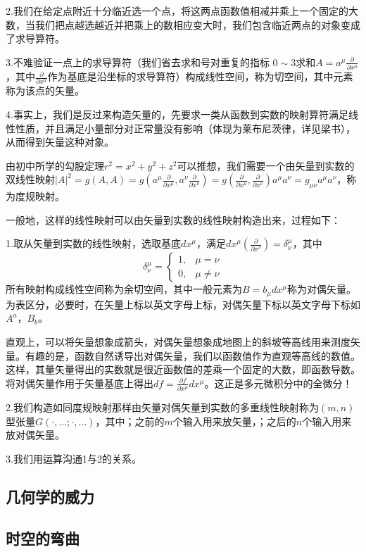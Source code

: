 \documentclass{article}
\begin{document}
2.我们在给定点附近十分临近选一个点，将这两点函数值相减并乘上一个固定的大数，当我们把点越选越近并把乘上的数相应变大时，我们包含临近两点的对象变成了求导算符。

3.不难验证一点上的求导算符（我们省去求和号对重复的指标 $ 0 \sim 3 $求和$A=a^\mu \frac{\partial}{\partial x^\mu }$，其中$\frac{\partial}{\partial x^\mu }$作为基底是沿坐标的求导算符）构成线性空间，称为切空间，其中元素称为该点的矢量。

4.事实上，我们是反过来构造矢量的，先要求一类从函数到实数的映射算符满足线性性质，并且满足小量部分对正常量没有影响（体现为莱布尼茨律，详见梁书），从而得到矢量这种对象。

由初中所学的勾股定理$r^2=x^2+y^2+z^2$可以推想，我们需要一个由矢量到实数的双线性映射$|A|^2=g(A,A)=g(a^\mu \frac{\partial}{\partial x^\mu },a^\nu \frac{\partial}{\partial x^\nu })=g( \frac{\partial}{\partial x^\mu }, \frac{\partial}{\partial x^\nu})a^\mu a^\nu=g_{\mu \nu }a^\mu a^\nu $，称为度规映射。

一般地，这样的线性映射可以由矢量到实数的线性映射构造出来，过程如下：

1.取从矢量到实数的线性映射，选取基底$dx^\mu $，满足$dx^\mu (\frac{\partial}{\partial x^\nu })=\delta ^\mu _\nu$，其中
\begin{equation*}
    \delta ^\mu _\nu =
    \begin{cases}
    1,&\mu=\nu
    \\0,&\mu\neq \nu
\end{cases}
\end{equation*}
所有映射构成线性空间称为余切空间，其中一般元素为$B=b_\mu dx^\mu $称为对偶矢量。为表区分，必要时，在矢量上标以英文字母上标，对偶矢量下标以英文字母下标如$A^a$，$B_b$。

直观上，可以将矢量想象成箭头，对偶矢量想象成地图上的斜坡等高线用来测度矢量。有趣的是，函数自然诱导出对偶矢量，我们以函数值作为直观等高线的数值。这样，其量矢量得出的实数就是很近函数值的差乘一个固定的大数，即函数导数。将对偶矢量作用于矢量基底上得出$df=\frac{\partial f}{\partial x^\mu }dx^\mu $。这正是多元微积分中的全微分！

2.我们构造如同度规映射那样由矢量对偶矢量到实数的多重线性映射称为$(m,n)$型张量$G(\cdot,\dots;\cdot,\dots)$，其中；之前的$m$个输入用来放矢量，；之后的$n$个输入用来放对偶矢量。

3.我们用运算沟通1与2的关系。
\subsection{几何学的威力}
\subsection{时空的弯曲}
\end{document}
